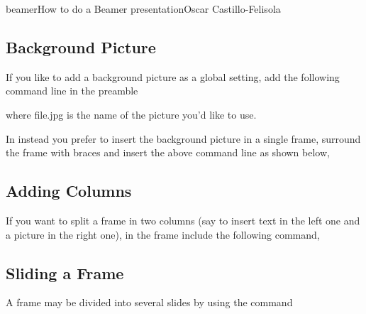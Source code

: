 \begin{article}[2]{beamer}{How to do a Beamer presentation}{Oscar Castillo-Felisola}
  \subsection{Background Picture}

  If you like to add a background picture as a global setting, add the following command line in the preamble


  where file.jpg is the name of the picture you’d like to use.

  In instead you prefer to insert the background picture in a single frame, surround the frame with braces and insert the above command line as shown below,






  \subsection{Adding Columns}

  If you want to split a frame in two columns (say to insert text in the left one and a picture in the right one), in the frame include the following command,







  \subsection{Sliding a Frame}

  A frame may be divided into several slides by using the command



\end{article}
